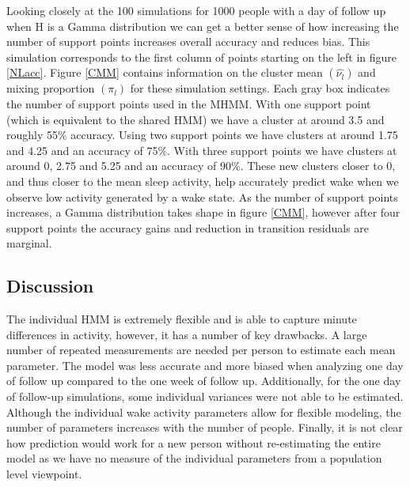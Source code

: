 \documentclass{article}
\begin{document}
Looking closely at the 100 simulations for 1000 people with a day of follow up when H is a Gamma distribution we can get a better sense of how increasing the number of support points increases overall accuracy and reduces bias. This simulation corresponds to the first column of points starting on the left in figure \ref{NLacc}. Figure \ref{CMM} contains information on the cluster mean $(\hat{\nu_l})$ and mixing proportion $(\pi_l)$ for these simulation settings. Each gray box indicates the number of support points used in the MHMM. With one support point (which is equivalent to the shared HMM) we have a cluster at around 3.5 and roughly 55\% accuracy. Using two support points we have clusters at around 1.75 and 4.25 and an accuracy of 75\%. With three support points we have clusters at around 0, 2.75 and 5.25 and an accuracy of 90\%. These new clusters closer to 0, and thus closer to the mean sleep activity, help accurately predict wake when we observe low activity generated by a wake state. As the number of support points increases, a Gamma distribution takes shape in figure \ref{CMM}, however after four support points the accuracy gains and reduction in transition residuals are marginal.


\subsection{Discussion}\label{SimStudyDiscussion}

The individual HMM is extremely flexible and is able to capture minute differences in activity, however, it has a number of key drawbacks. A large number of repeated measurements are needed per person to estimate each mean parameter. The model was less accurate and more biased when analyzing one day of follow up compared to the one week of follow up. Additionally, for the one day of follow-up simulations, some individual variances were not able to be estimated. Although the individual wake activity parameters allow for flexible modeling, the number of parameters increases with the number of people. Finally, it is not clear how prediction would work for a new person without re-estimating the entire model as we have no measure of the individual parameters from a population level viewpoint.
\end{document}

